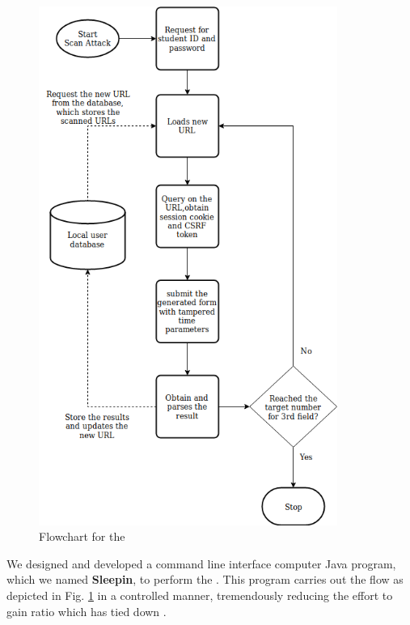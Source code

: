 \documentclass[runningheads]{llncs}
\begin{document}
\begin{figure}
    \includegraphics[width=0.87\textwidth]{imgres/flowchart_sleepin.png}
\caption{Flowchart for the \scanattack{}} 
\label{fig:flowchart_scan}
\centering
\end{figure}

We designed and developed a command line interface computer Java program, which we named \textbf{Sleepin}, to perform the \scanattack{}. This program carries out the flow as depicted in Fig. \ref{fig:flowchart_scan}
in a controlled manner, tremendously reducing the effort to gain ratio which has tied down \theattack{}. 
\end{document}
